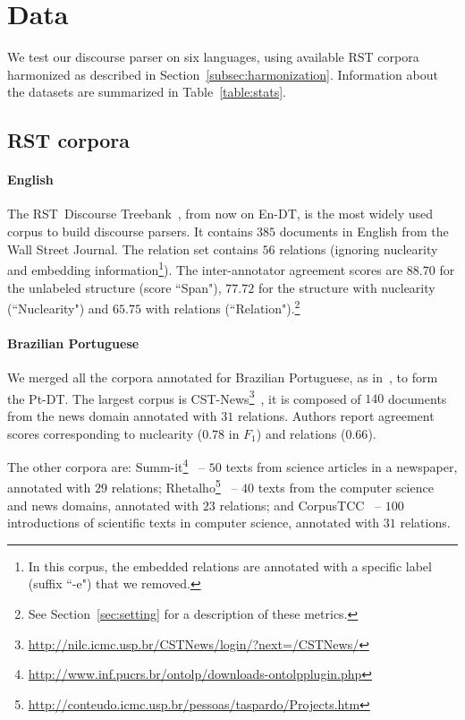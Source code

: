 \documentclass[11pt]{article}
\newcommand{\erstdt}{En-DT}
\newcommand{\brrst}{Pt-DT}
\begin{document}
\section{Data}
\label{sec:data}

We test our discourse parser on six languages, using available RST corpora  harmonized as described in Section~\ref{subsec:harmonization}.
Information about the datasets are summarized in Table~\ref{table:stats}.


\subsection{RST corpora}

\paragraph{English}

The RST~Discourse Treebank~\cite{carlson:discourse:2001}, from now on \erstdt, is the most widely used corpus to build discourse parsers.
It contains $385$ documents in English from the Wall Street Journal.
The relation set contains $56$ relations (ignoring nuclearity and embedding information\footnote{In this corpus, the embedded relations are annotated with a specific label (suffix ``-e") that we removed.}).
The inter-annotator agreement scores are $88.70$ for the unlabeled structure (score ``Span"), $77.72$ for the structure with nuclearity (``Nuclearity") and $65.75$ with relations (``Relation").\footnote{See Section~\ref{sec:setting} for a description of these metrics.}

\paragraph{Brazilian Portuguese}

We merged all the corpora annotated for Brazilian Portuguese, as in~\cite{maziero:adaptation:2015}, to form the \brrst.
The largest corpus is CST-News\footnote{\url{http://nilc.icmc.usp.br/CSTNews/login/?next=/CSTNews/}}~\cite{cardoso:cstnews:2011}, it is composed of $140$ documents from the news domain annotated with $31$ relations. 
Authors report agreement scores corresponding to nuclearity ($0.78$ in $F_1$) and relations ($0.66$).

The other corpora are: 
Summ-it\footnote{\url{http://www.inf.pucrs.br/ontolp/downloads-ontolpplugin.php}}~\cite{collovini:summit:2007} -- $50$ texts from science articles in a newspaper, annotated with $29$ relations; Rhetalho\footnote{\url{http://conteudo.icmc.usp.br/pessoas/taspardo/Projects.htm}\label{rhetalho}}~\cite{pardo:rhetalho:2005} -- $40$ texts from the computer science and news domains, annotated with $23$ relations; and CorpusTCC~\cite{pardo:construccao:2003,pardo:relaccoes:2004} -- $100$ introductions of scientific texts in computer science, annotated with $31$ relations.
\end{document}
